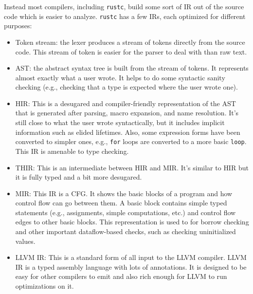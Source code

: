\documentclass{article}
\begin{document}
Instead most compilers, including \lstinline{rustc}, build some sort of \ac{IR} out of the source code which is easier to analyze. \lstinline{rustc} has a few \acp{IR}, each optimized for different purposes:

\begin{itemize}
    \item Token stream: the lexer produces a stream of tokens directly from the source code. This stream of token is easier for the parser to deal with than raw text.
    \item \ac{AST}: the abstract syntax tree is built from the stream of tokens. It represents almost exactly what a user wrote. It helps to do some syntactic sanity checking (e.g., checking that a type is expected where the user wrote one).
    \item \ac{HIR}: This is a desugared and compiler-friendly representation of the \ac{AST} that is generated after parsing, macro expansion, and name resolution. It's still close to what the user wrote syntactically, but it includes implicit information such as elided lifetimes. Also, some expression forms have been converted to simpler ones, e.g., \lstinline{for} loops are converted to a more basic \lstinline{loop}. This \ac{IR} is amenable to type checking.
    \item \ac{THIR}: This is an intermediate between \ac{HIR} and \ac{MIR}. It's similar to \ac{HIR} but it is fully typed and a bit more desugared.
    \item \ac{MIR}: This \ac{IR} is a \ac{CFG}. It shows the basic blocks of a program and how control flow can go between them. A basic block contains simple typed statements (e.g., assignments, simple computations, etc.) and control flow edges to other basic blocks. This representation is used to for borrow checking and other important dataflow-based checks, such as checking uninitialized values.
    \item LLVM \ac{IR}: This is a standard form of all input to the LLVM compiler. LLVM \ac{IR} is a typed assembly language with lots of annotations. It is designed to be easy for other compilers to emit and also rich enough for LLVM to run optimizations on it.
\end{itemize}
\end{document}
